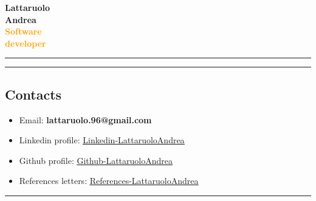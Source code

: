 \documentclass[a4paper,10pt]{article}
\begin{document}
\thispagestyle{empty} %

\noindent
\begin{minipage}[t]{0.25\textwidth}
    \vspace{0.3cm}
    { \LARGE  \textbf{Lattaruolo \\[0.1cm] Andrea \\[0.1cm] \textcolor{orange}{\newline Software \\[0.1cm] developer}}} \\[0.5cm]
    \rule{0.6cm}{0.3mm}
\end{minipage}
\hfill
\begin{minipage}[t]{0.75\textwidth}
    \rule{\linewidth}{0.5mm} %
    \subsection*{Contacts}
    \begin{itemize}[leftmargin=1cm]
        \item Email: \textbf{lattaruolo.96@gmail.com}
        \item Linkedin profile: \textcolor{blue}{\uline\href{https://github.com/LattaruoloAndrea}{
        {Linkedin-LattaruoloAndrea}}} 
        \item Github profile: \textcolor{blue}{\uline{\href{https://github.com/LattaruoloAndrea}{Github-LattaruoloAndrea}}}
        \item References letters: \textcolor{blue}{\uline{\href{https://github.com/LattaruoloAndrea/CV/tree/main/references}{References-LattaruoloAndrea}}}
    \end{itemize}
    \vspace{0.8cm}
    \rule{\linewidth}{0.5mm}
\end{minipage}
\end{document}

